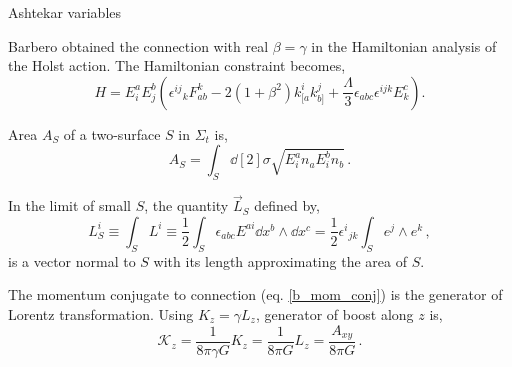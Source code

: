 \documentclass[12pt,titlepage]{article}
\begin{document}
\begin{frame}{Ashtekar variables}
    \begin{list}{\,}{\leftmargin=1em \itemindent=0em}
        \item<1-> Barbero obtained the connection with real $\beta=\gamma$ in the Hamiltonian analysis of the Holst action. The Hamiltonian constraint becomes,
        \begin{equation}
            H=E^a_i E^b_j\left({\epsilon^{ij}}_k F^k_{ab}-2(1+\beta^2)k^i_{[a}k^j_{b]}+\frac{\Lambda}{3}\epsilon_{abc}\epsilon^{ijk}E^c_k\right).
        \end{equation}
        \item<2-> Area $A_S$ of a two-surface $S$ in $\Sigma_t$ is,
        \begin{equation}
            A_S=\int_S \dd[2]{\sigma}\sqrt{E^a_i n_a E^b_i n_b}\,.
        \end{equation}
        \item<3-> In the limit of small $S$, the quantity $\vec{L}_S$ defined by,
        \begin{equation}
            L_S^i\equiv\int_S L^i\equiv\frac{1}{2}\int_S \epsilon_{abc} E^{ai} \dd{x^b}\wedge\dd{x^c}=\frac{1}{2}{\epsilon^{i}}_{jk}\int_S e^j \wedge e^k\,,
        \end{equation}
        is a vector normal to $S$ with its length approximating the area of $S$.
        \item<4-> The momentum conjugate to connection (eq. \ref{b_mom_conj}) is the generator of Lorentz transformation. Using $K_z=\gamma L_z$, generator of boost along $z$ is,
        \begin{equation}
            \mathcal{K}_z=\frac{1}{8\pi\gamma G}K_z=\frac{1}{8\pi G}L_z=\frac{A_{xy}}{8\pi G}\,.
        \end{equation}
    \end{list}
\end{frame}
\end{document}

